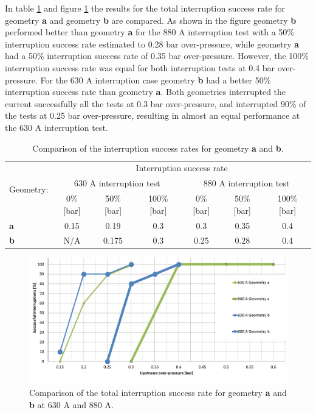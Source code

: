 \documentclass[10pt,b5paper,twoside]{article}
\begin{document}
In table \ref{tab:compgeoAandB} and figure \ref{fig:compgeoAandBAllcurrents} the results for the total interruption success rate for geometry \textbf{a} and geometry \textbf{b} are compared. As shown in the figure geometry \textbf{b} performed better than geometry \textbf{a} for the 880 A interruption test with a 50\% interruption success rate estimated to 0.28 bar over-pressure, while geometry \textbf{a} had a 50\% interruption success rate of 0.35 bar over-pressure. However, the 100\% interruption success rate was equal for both interruption tests at 0.4 bar over-pressure. For the 630 A interruption case geometry \textbf{b} had a better 50\% interruption success rate than geometry \textbf{a}. Both geometries interrupted the current successfully all the tests at 0.3 bar over-pressure, and interrupted 90\% of the tests at 0.25 bar over-pressure, resulting in almost an equal performance at the 630 A interruption test.

\begin{table}[h]
\center
\caption{Comparison of the interruption success rates for geometry \textbf{a} and \textbf{b}.}
\begin{tabular}{|l|c|c|c|c|c|c|}
\hline
\multirow{3}{*}{Geometry:} & \multicolumn{6}{|c|}{Interruption success rate}                                                           \\ \cline{2-7} 
                          & \multicolumn{3}{|c}{630 A interruption test}        & \multicolumn{3}{|c|}{880 A interruption test}       \\ \cline{2-7} 
                          & 0\% {[}bar{]} & 50\% {[}bar{]} & 100\% {[}bar{]} & 0\% {[}bar{]} & 50\% {[}bar{]} & 100\% {[}bar{]} \\ \hline
\textbf{a}                & 0.15           & 0.19            & 0.3              & 0.3            & 0.35            & 0.4              \\ \hline
\textbf{b}                & N/A            & 0.175           & 0.3              & 0.25           & 0.28            & 0.4              \\ \hline
\end{tabular}
\label{tab:compgeoAandB}
\end{table}

\begin{figure}[H]
\centering
\includegraphics[scale=0.5, angle =90 ]{Bilder/Results/compGeoAandBNew2.PNG}
\caption{Comparison of the total interruption success rate for geometry \textbf{a} and \textbf{b} at 630 A and 880 A.} \label{fig:compgeoAandBAllcurrents}
\end{figure}
\end{document}
